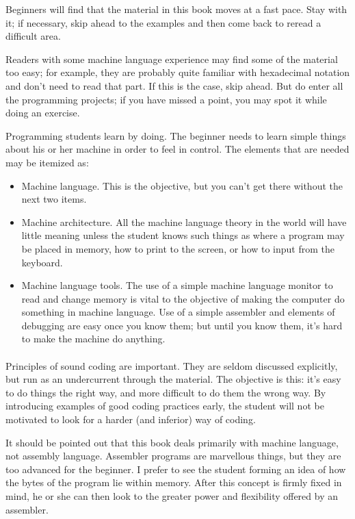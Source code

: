 \documentclass[11pt,a4paper,titlepage]{memoir}
\begin{document}
Beginners will find that the material in this book moves at a fast pace. Stay with it; if necessary, skip ahead to the examples and then come back to reread a difficult
area.

Readers with some machine language experience may find some of the material too easy; for example, they are probably quite familiar with hexadecimal notation and don't need to read that part. If this is the case, skip ahead. But do enter all the programming projects; if you have missed a point, you may spot it while doing an exercise.

Programming students learn by doing. The beginner needs to learn simple things about his or her machine in order to feel in control. The elements that are needed may be itemized as:
\begin{itemize}
	\item Machine language. This is the objective, but you can't get there without the next two items.
	\item Machine architecture. All the machine language theory in the world will have little meaning unless the student knows such things as where a program may be placed in memory, how to print to the screen, or how to input from the keyboard.
	\item Machine language tools. The use of a simple machine language monitor to read and change memory is vital to the objective of making the computer do something in machine language. Use of a simple assembler and elements of debugging are easy once you know them; but until you know them, it's hard to make the machine do anything.
\end{itemize}
\paragraph{}
Principles of sound coding are important. They are seldom discussed explicitly, but run as an undercurrent through the material. The objective is this: it's easy to do things the right way, and more difficult to do them the wrong way. By introducing examples of good coding practices early, the student will not be motivated to look for a harder (and inferior) way of coding.

It should be pointed out that this book deals primarily with machine language, not assembly language. Assembler programs are marvellous things, but they are too advanced for the beginner. I prefer to see the student forming an idea of how the bytes of the program lie within memory. After this concept is firmly fixed in mind, he or she can then look to the greater power and flexibility offered by an
assembler.
\end{document}
